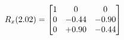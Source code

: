 \documentclass[preview]{standalone}
\begin{document}
\begin{align*}
\special{dvisvgm:raw <g id='unique000'>}R_{x}(2.02) = \begin{bmatrix}1 & 0 & 0 \\0 & -0.44 & -0.90 \\0 & +0.90 & -0.44\end{bmatrix}\special{dvisvgm:raw </g>}
\end{align*}
\end{document}
